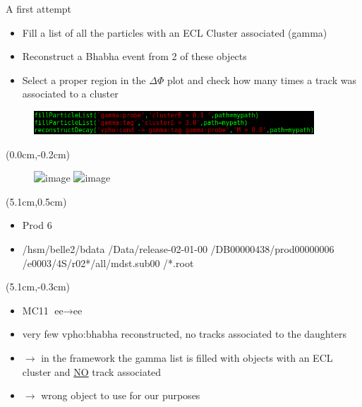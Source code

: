 \documentclass[10pt]{beamer}
\begin{document}
{\begin{frame}{A first attempt}
\begin{textblock*}{\textwidth}
\begin{itemize}
	\item Fill a list of all the particles with an ECL Cluster associated (gamma)
	\item Reconstruct a Bhabha event from 2 of these objects
	\item Select a proper region in the $\Delta \Phi$ plot and check how many times a track was associated to a cluster
	
\end{itemize}

\begin{figure}
	\includegraphics[width=10.5cm]{Plots/oldSc}
\end{figure}

	\end{textblock*}


	

	
	\begin{textblock*}{0.55\textwidth}(0.0cm,-0.2cm)
		\begin{figure}
			\includegraphics<1>[width=4.5cm]{Plots/DeltaPhi}
			\includegraphics<2>[width=4.5cm]{Plots/dphiMC}
		\end{figure}
	\end{textblock*}


		\begin{textblock*}{0.4\textwidth}(5.1cm,0.5cm)
			\begin{itemize}
				\item<1> Prod 6
		 \item<1> /hsm/belle2/bdata /Data/release-02-01-00 /DB00000438/prod00000006 /e0003/4S/r02*/all/mdst.sub00 /*.root
\end{itemize}
	\end{textblock*}
	
		\begin{textblock*}{0.55\textwidth}(5.1cm,-0.3cm)
	\begin{itemize}
		\item<2> MC11 $\textrm{ee}\rightarrow \textrm{ee}$
		\item<2> very few $\textrm{vpho:bhabha}$ reconstructed, no tracks associated to the daughters
		\item<2> $\rightarrow$ in the framework the gamma list is filled with objects with an ECL cluster and \underline{NO} track associated
		\item<2> $\rightarrow$ wrong object to use for our purposes
	\end{itemize}
\end{textblock*}




\end{frame}}
\end{document}
